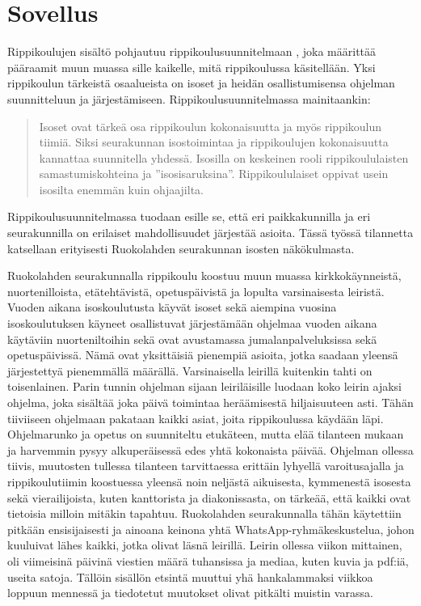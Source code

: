 \chapter{Sovellus}
\label{ch:sovellus}

Rippikoulujen sisältö pohjautuu rippikoulusuunnitelmaan
\parencite{evlSuuriIhmeRippikoulusuunnitelma2017}, joka määrittää pääraamit
muun muassa sille kaikelle, mitä rippikoulussa käsitellään. Yksi rippikoulun
tärkeistä osaalueista on isoset ja heidän osallistumisensa ohjelman
suunnitteluun ja järjestämiseen. Rippikoulusuunnitelmassa
\parencite{evlSuuriIhmeRippikoulusuunnitelma2017} mainitaankin:

\begin{quotation}
    \noindent Isoset ovat tärkeä osa rippikoulun kokonaisuutta ja myös
    rippikoulun tiimiä. Siksi seurakunnan isostoimintaa ja rippikoulujen
    kokonaisuutta kannattaa suunnitella yhdessä. Isosilla on keskeinen rooli
    rippikoululaisten samastumiskohteina ja ”isosisaruksina”. Rippikoululaiset
    oppivat usein isosilta enemmän kuin ohjaajilta.
\end{quotation}

Rippikoulusuunnitelmassa tuodaan esille se, että eri paikkakunnilla ja eri
seurakunnilla on erilaiset mahdollisuudet järjestää asioita. Tässä työssä
tilannetta katsellaan erityisesti Ruokolahden seurakunnan isosten näkökulmasta.

Ruokolahden seurakunnalla rippikoulu koostuu muun muassa kirkkokäynneistä,
nuortenilloista, etätehtävistä, opetuspäivistä ja lopulta varsinaisesta
leiristä. Vuoden aikana isoskoulutusta käyvät isoset sekä aiempina vuosina
isoskoulutuksen käyneet osallistuvat järjestämään ohjelmaa vuoden aikana
käytäviin nuorteniltoihin sekä ovat avustamassa jumalanpalveluksissa sekä
opetuspäivissä. Nämä ovat yksittäisiä pienempiä asioita, jotka saadaan
yleensä järjestettyä pienemmällä määrällä. Varsinaisella leirillä kuitenkin
tahti on toisenlainen. Parin tunnin ohjelman sijaan leiriläisille luodaan koko
leirin ajaksi ohjelma, joka sisältää joka päivä toimintaa heräämisestä
hiljaisuuteen asti. Tähän tiiviiseen ohjelmaan pakataan kaikki asiat, joita
rippikoulussa käydään läpi. Ohjelmarunko ja opetus on suunniteltu etukäteen,
mutta elää tilanteen mukaan ja harvemmin pysyy alkuperäisessä edes yhtä
kokonaista päivää. Ohjelman ollessa tiivis, muutosten tullessa tilanteen
tarvittaessa erittäin lyhyellä varoitusajalla ja rippikoulutiimin koostuessa
yleensä noin neljästä aikuisesta, kymmenestä isosesta sekä vierailijoista,
kuten kanttorista ja diakonissasta, on tärkeää, että kaikki ovat tietoisia
milloin mitäkin tapahtuu. Ruokolahden seurakunnalla tähän käytettiin pitkään
ensisijaisesti ja ainoana keinona yhtä WhatsApp-ryhmäkeskustelua, johon
kuuluivat lähes kaikki, jotka olivat läsnä leirillä. Leirin ollessa viikon
mittainen, oli viimeisinä päivinä viestien määrä tuhansissa ja mediaa, kuten
kuvia ja pdf:iä, useita satoja. Tällöin sisällön etsintä muuttui yhä
hankalammaksi viikkoa loppuun mennessä ja tiedotetut muutokset olivat pitkälti
muistin varassa.

